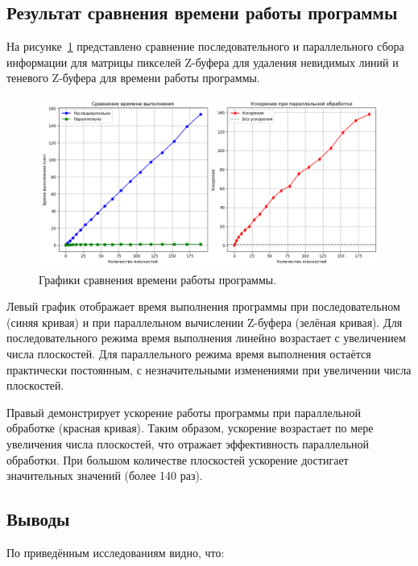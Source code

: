 \subsection{Результат сравнения времени работы программы}

\hspace{1.25cm}
На рисунке~\ref{fig:test_calc_pixel_matrix_performance} представлено сравнение последовательного и параллельного сбора информации для матрицы пикселей Z-буфера для удаления невидимых линий и теневого Z-буфера для времени работы программы.

\begin{figure}[H]
    \centering
    \includegraphics[width=1\textwidth]{img/test_calc_pixel_matrix_performance.png}
    \caption{Графики сравнения времени работы программы.}
    \label{fig:test_calc_pixel_matrix_performance}
\end{figure}

Левый график отображает время выполнения программы при последовательном (синяя кривая) и при параллельном вычислении Z-буфера (зелёная кривая). Для последовательного режима время выполнения линейно возрастает с увеличением числа плоскостей. Для параллельного режима время выполнения остаётся практически постоянным, с незначительными изменениями при увеличении числа плоскостей.

Правый демонстрирует ускорение работы программы при параллельной обработке (красная кривая). Таким образом, ускорение возрастает по мере увеличения числа плоскостей, что отражает эффективность параллельной обработки. При большом количестве плоскостей ускорение достигает значительных значений (более 140 раз).


\subsection{Выводы}

\hspace{1.25cm}
По приведённым исследованиям видно, что:

